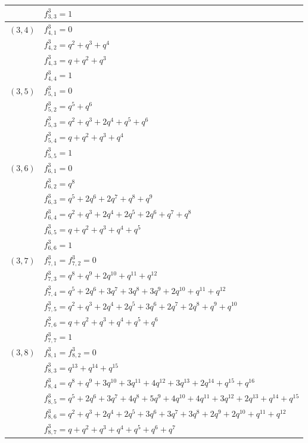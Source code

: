 \documentclass[a4paper,10pt]{article}
\begin{document}
\begin{appendix}
\begin{table}[H]
\begin{tabular}{|c|l|}
        & $f^3_{3,3} = 1$ \\
\hline
$(3,4)$ & $f^3_{4,1} = 0$ \\
        & $f^3_{4,2} = q^2 + q^3 + q^4$ \\
        & $f^3_{4,3} = q + q^2 + q^3$ \\
        & $f^3_{4,4} = 1$ \\
\hline
$(3,5)$ & $f^3_{5,1} = 0$ \\
        & $f^3_{5,2} = q^5 + q^6$ \\
        & $f^3_{5,3} = q^2 + q^3 + 2q^4 + q^5 + q^6$ \\
        & $f^3_{5,4} = q + q^2 + q^3 + q^4$ \\
        & $f^3_{5,5} = 1$ \\
\hline
$(3,6)$ & $f^3_{6,1} = 0$ \\
        & $f^3_{6,2} = q^8$ \\
        & $f^3_{6,3} = q^5 + 2q^6 + 2q^7 + q^8 + q^9$ \\
        & $f^3_{6,4} = q^2 + q^3 + 2q^4 + 2q^5 + 2q^6 + q^7 + q^8$ \\
        & $f^3_{6,5} = q + q^2 + q^3 + q^4 + q^5$ \\
        & $f^3_{6,6} = 1$ \\
\hline
$(3,7)$ & $f^3_{7,1} = f^3_{7,2} = 0$ \\
        & $f^3_{7,3} = q^8 + q^9 + 2q^{10} + q^{11} + q^{12}$ \\
        & $f^3_{7,4} = q^5 + 2q^6 + 3q^7 + 3q^8 + 3q^9 + 2q^{10} + q^{11} + q^{12}$ \\
        & $f^3_{7,5} = q^2 + q^3 + 2q^4 + 2q^5 + 3q^6 + 2q^7 + 2q^8 + q^9 + q^{10}$ \\
        & $f^3_{7,6} = q + q^2 + q^3 + q^4 + q^5 + q^6$ \\
        & $f^3_{7,7} = 1$ \\
\hline
$(3,8)$ & $f^3_{8,1} = f^3_{8,2} = 0$ \\
        & $f^3_{8,3} = q^{13} + q^{14} + q^{15}$ \\
        & $f^3_{8,4} = q^8 + q^9 + 3q^{10} + 3q^{11} + 4q^{12} + 3q^{13} + 2q^{14} + q^{15} + q^{16}$ \\
        & $f^3_{8,5} = q^5 + 2q^6 + 3q^7 + 4q^8 + 5q^9 + 4q^{10} + 4q^{11} + 3q^{12} + 2q^{13} + q^{14} + q^{15}$ \\
        & $f^3_{8,6} = q^2 + q^3 + 2q^4 + 2q^5 + 3q^6 + 3q^7 + 3q^8 + 2q^9 + 2q^{10} + q^{11} + q^{12}$ \\
        & $f^3_{8,7} = q + q^2 + q^3 + q^4 + q^5 + q^6 + q^7$ \\

\end{tabular}
\end{table}
\end{appendix}
\end{document}
